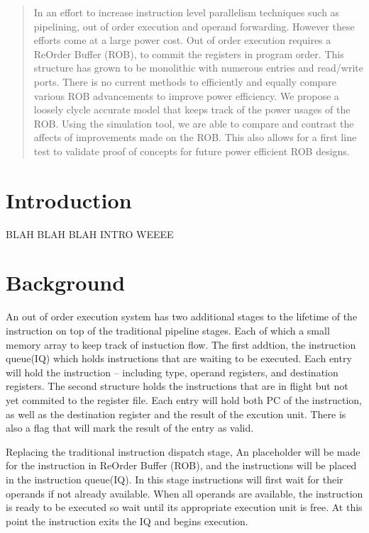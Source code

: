 \documentclass{acm_proc_article-sp}
\begin{document}
\maketitle
\begin{abstract}
	In an effort to increase instruction level parallelism techniques such 
as pipelining, out of order execution and operand forwarding.  However 
these efforts come at a large power cost.  Out of order execution requires
a ReOrder Buffer (ROB), to commit the registers in program order.  This 
structure has grown to be monolithic with numerous entries and read/write ports.
There is no current methods to efficiently and equally compare various
ROB advancements to improve power efficiency. We propose a loosely clycle
accurate model that keeps track of the power usages of the ROB.  Using the 
simulation tool, we are able to compare and contrast the affects of improvements
made on the ROB.  This also allows for a first line test to validate proof of 
concepts for future power efficient ROB designs. 
\end{abstract}



\section{Introduction}
BLAH BLAH BLAH INTRO WEEEE
\section{Background}
    An out of order execution system has two additional stages 
to the lifetime of the instruction on top of the traditional pipeline 
stages.  Each of which a small memory array to keep track of instuction flow.
The first addtion, the instruction queue(IQ) which holds instructions that are 
waiting to be executed.  Each entry will hold the instruction -- including 
type, operand registers, and destination registers.  The second structure 
holds the instructions that are in flight but not yet commited to the register
file. Each entry will hold both PC of the instruction, as well as the destination
register and the result of the excution unit.  There is also a flag that will
mark the result of the entry as valid.  

Replacing the traditional instruction dispatch stage, An placeholder will be made for the 
instruction in ReOrder Buffer (ROB), and the instructions will be placed
in the instruction queue(IQ). In this stage instructions will first wait for their operands if not already
available.  When all operands are available, the instruction is ready to 
be executed so wait until its appropriate execution unit is free.  At this 
point the instruction exits the IQ and begins execution.  
\end{document}
